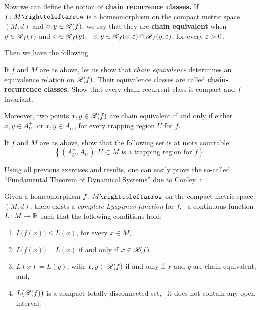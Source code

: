 Now we can define the notion of \textbf{chain recurrence classes.} If $f\colon M\carr$ is a homeomorphism on the compact metric space $(M,d)$ and $x,y\in\mathscr{R{}}(f)$, we say that they are \textbf{chain equivalent} when $y\in\mathscr{R{}}_{f}(x)$ and $x\in\mathscr{R{}}_{f}(y)$, \ie~$x,y\in\mathscr{R{}}_f(x,\varepsilon)\cap\mathscr{R{}}_f(y,\varepsilon)$, for every $\varepsilon>0$.

Then we have the following

\begin{exercise}
  If $f$ and $M$ are as above, let us show that \emph{chain equivalence} determines an equivalence relation on $\mathscr{R{}}(f)$. Their equivalence classes are called \textbf{chain-recurrence classes.} Show that every chain-recurrent class is compact and $f$-invariant.

  Moreover, two points $x,y\in\mathscr{R{}}(f)$ are chain equivalent if and only if either $x,y\in A_U^+$, or $x,y\in A_U^-$, for every trapping region $U$ for $f$.
\end{exercise}

\begin{exercise}
  If $f$ and $M$ are as above, show that the following set is at mots countable:
  \begin{displaymath}
    \left\{(A_U^+,A_U^-) : U\subset M \text{ is a trapping region for  } f\right\}.
  \end{displaymath}
\end{exercise}

Using all previous exercises and results, one can easily prove the so-called ``Fundamental Theorem of Dynamical Systems'' due to Conley~\cite{ConleyIsolInvSets}:

\begin{theorem}\label{thm:fund-thm-dyn-sys}
  Given a homeomorphism $f\colon M\carr$ on the compact metric space $(M,d)$, there exists a \emph{complete Lyapunov function} for $f$, \ie~a continuous function $L\colon M\to\mathbb{R}$ such that the following conditions hold:
  \begin{enumerate}
    \item $L\big(f(x)\big)\leq L(x)$, for every $x\in M$,
    \item $L\big(f(x)\big)=L(x)$ if and only if $x\in\mathscr{R{}}(f)$,
    \item $L(x)=L(y)$, with $x,y\in\mathscr{R{}}(f)$ if and only if $x$ and $y$ are chain equivalent, and,
    \item $L\big(\mathscr{R{}}(f)\big)$ is a compact totally disconnected set, \ie~it does not contain any open interval.
  \end{enumerate}
\end{theorem}
